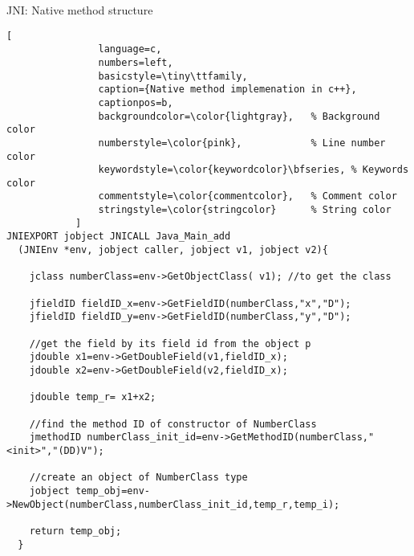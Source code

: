 \begin{frame}[fragile]{JNI: Native method structure}
    \begin{center}
        \begin{minipage}{0.8\textwidth} %
            \begin{lstlisting}[
                language=c,
                numbers=left,
                basicstyle=\tiny\ttfamily,
                caption={Native method implemenation in c++},
                captionpos=b,
                backgroundcolor=\color{lightgray},   % Background color
                numberstyle=\color{pink},            % Line number color
                keywordstyle=\color{keywordcolor}\bfseries, % Keywords color
                commentstyle=\color{commentcolor},   % Comment color
                stringstyle=\color{stringcolor}      % String color
            ]
JNIEXPORT jobject JNICALL Java_Main_add
  (JNIEnv *env, jobject caller, jobject v1, jobject v2){

    jclass numberClass=env->GetObjectClass( v1); //to get the class

    jfieldID fieldID_x=env->GetFieldID(numberClass,"x","D");
    jfieldID fieldID_y=env->GetFieldID(numberClass,"y","D");

    //get the field by its field id from the object p
    jdouble x1=env->GetDoubleField(v1,fieldID_x);
    jdouble x2=env->GetDoubleField(v2,fieldID_x);

    jdouble temp_r= x1+x2;

    //find the method ID of constructor of NumberClass
    jmethodID numberClass_init_id=env->GetMethodID(numberClass,"<init>","(DD)V");

    //create an object of NumberClass type
    jobject temp_obj=env->NewObject(numberClass,numberClass_init_id,temp_r,temp_i);

    return temp_obj;
  }
            \end{lstlisting}
        \end{minipage}
    \end{center}
\end{frame}
